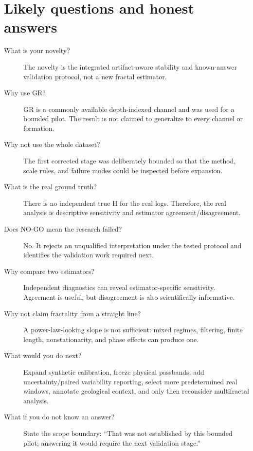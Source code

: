 \documentclass[11pt,a4paper]{article}
\begin{document}
\section{Likely questions and honest answers}
\begin{description}
\item[What is your novelty?] The novelty is the integrated artifact-aware stability and known-answer validation protocol, not a new fractal estimator.
\item[Why use GR?] GR is a commonly available depth-indexed channel and was used for a bounded pilot. The result is not claimed to generalize to every channel or formation.
\item[Why not use the whole dataset?] The first corrected stage was deliberately bounded so that the method, scale rules, and failure modes could be inspected before expansion.
\item[What is the real ground truth?] There is no independent true H for the real logs. Therefore, the real analysis is descriptive sensitivity and estimator agreement/disagreement.
\item[Does NO-GO mean the research failed?] No. It rejects an unqualified interpretation under the tested protocol and identifies the validation work required next.
\item[Why compare two estimators?] Independent diagnostics can reveal estimator-specific sensitivity. Agreement is useful, but disagreement is also scientifically informative.
\item[Why not claim fractality from a straight line?] A power-law-looking slope is not sufficient: mixed regimes, filtering, finite length, nonstationarity, and phase effects can produce one.
\item[What would you do next?] Expand synthetic calibration, freeze physical passbands, add uncertainty/paired variability reporting, select more predetermined real windows, annotate geological context, and only then reconsider multifractal analysis.
\item[What if you do not know an answer?] State the scope boundary: “That was not established by this bounded pilot; answering it would require the next validation stage.”
\end{description}
\end{document}
